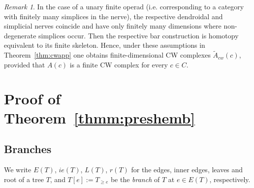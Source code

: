 \documentclass{amsart}
\theoremstyle{definition}
\theoremstyle{remark}
\newtheorem{remark}[formula]{Remark}
\begin{document}
	\begin{remark}
		In the case of a unary finite operad (i.e. corresponding to a category with finitely many simplices in the nerve), the respective dendroidal and simplicial nerves coincide and have only finitely many dimensions where non-degenerate simplices occur.
		Then the respective bar construction is homotopy equivalent to its finite skeleton.
		Hence, under these assumptions in Theorem~\ref{thm:cwapp} one obtains finite-dimensional CW complexes $\widetilde{A}_{cw}(c)$, provided that $A(c)$ is a finite CW complex for every $c\in C$.
	\end{remark}
	
	\section{Proof of Theorem~\ref{thmm:preshemb}}\label{sec:thm3}

	\subsection{Branches}\label{ssec:branch}

	We write $E(T)$, $ie(T)$, $L(T)$, $r(T)$ for the edges, inner edges, leaves and root of a
	tree $T$, and $T[e]:=T_{\geqslant e}$ be the \textit{branch} of $T$ at $e\in E(T)$, respectively. 
\end{document}

